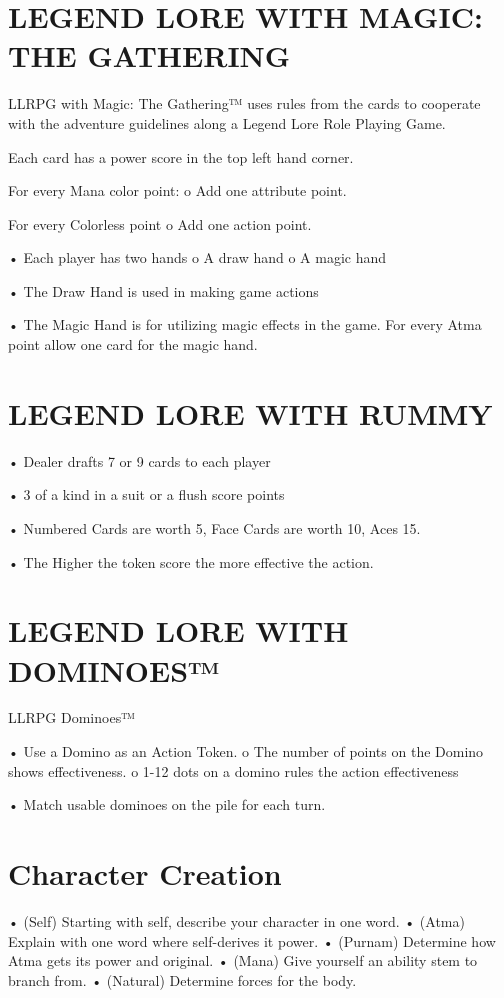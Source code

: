 \documentclass{article}
\begin{document}
\section{LEGEND LORE WITH MAGIC: THE GATHERING}

LLRPG with Magic: The Gathering™ uses rules from the cards to cooperate with the adventure
guidelines along a Legend Lore Role Playing Game. 

Each card has a power score in the top left hand corner.

For every Mana color point: o Add one attribute point.

For every Colorless point o Add one action point.

• Each player has two hands o A draw hand o A magic hand

• The Draw Hand is used in making game actions

• The Magic Hand is for utilizing magic effects in the game. For every Atma point allow
one card for the magic hand.

\section{LEGEND LORE WITH RUMMY}

• Dealer drafts 7 or 9 cards to each player

• 3 of a kind in a suit or a flush score points

• Numbered Cards are worth 5, Face Cards are worth 10, Aces 15.

• The Higher the token score the more effective the action.

\section{LEGEND LORE WITH DOMINOES™}

LLRPG Dominoes™

• Use a Domino as an Action Token. o The number of points on the Domino shows
effectiveness. o 1-12 dots on a domino rules the action effectiveness

• Match usable dominoes on the pile for each turn.

\section{Character Creation}

• (Self) Starting with self, describe your character in one word.
• (Atma) Explain with one word where self-derives it power.
• (Purnam) Determine how Atma gets its power and original.
• (Mana) Give yourself an ability stem to branch from.
• (Natural) Determine forces for the body.
\end{document}
